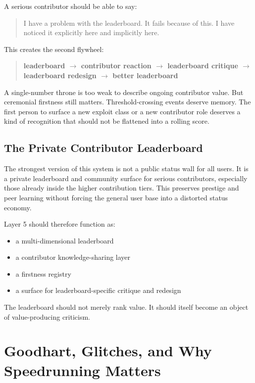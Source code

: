\documentclass[11pt]{article}
\begin{document}
A serious contributor should be able to say:

\begin{quote}
I have a problem with the leaderboard. It fails because of this. I have noticed it explicitly here and implicitly here.
\end{quote}

This creates the second flywheel:

\begin{quote}
\textbf{leaderboard $\rightarrow$ contributor reaction $\rightarrow$ leaderboard critique $\rightarrow$ leaderboard redesign $\rightarrow$ better leaderboard}
\end{quote}

A single-number throne is too weak to describe ongoing contributor value. But ceremonial firstness still matters. Threshold-crossing events deserve memory. The first person to surface a new exploit class or a new contributor role deserves a kind of recognition that should not be flattened into a rolling score.

\subsection{The Private Contributor Leaderboard}

The strongest version of this system is not a public status wall for all users. It is a private leaderboard and community surface for serious contributors, especially those already inside the higher contribution tiers. This preserves prestige and peer learning without forcing the general user base into a distorted status economy.

Layer 5 should therefore function as:

\begin{itemize}
  \item a multi-dimensional leaderboard
  \item a contributor knowledge-sharing layer
  \item a firstness registry
  \item a surface for leaderboard-specific critique and redesign
\end{itemize}

The leaderboard should not merely rank value. It should itself become an object of value-producing criticism.

\section{Goodhart, Glitches, and Why Speedrunning Matters}
\end{document}
